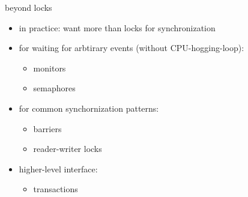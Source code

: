 \begin{frame}[fragile,label=beyondLock]{beyond locks}
    \begin{itemize}
    \item in practice: want more than locks for synchronization
    \item for waiting for arbtirary events (without CPU-hogging-loop):
        \begin{itemize}
        \item monitors
        \item semaphores
        \end{itemize}
    \item for common synchornization patterns:
        \begin{itemize}
        \item barriers
        \item reader-writer locks
        \end{itemize}
    \item higher-level interface:
        \begin{itemize}
        \item transactions
        \end{itemize}
    \end{itemize}
\end{frame}
